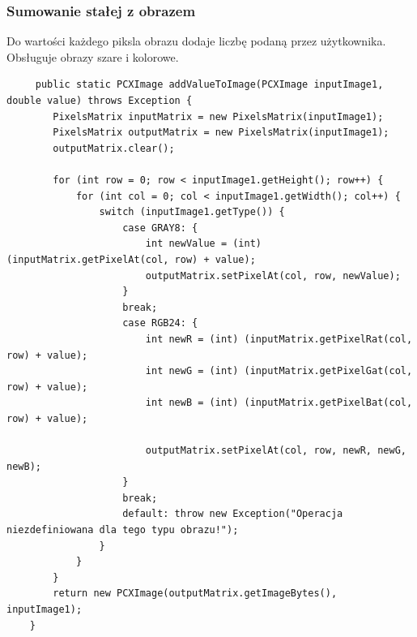 \documentclass{article}
\begin{document}
	\subsubsection{Sumowanie stałej z obrazem}
	Do wartości każdego piksla obrazu dodaje liczbę podaną przez użytkownika. Obsługuje obrazy szare i kolorowe. 
	
	\begin{verbatim}
	 public static PCXImage addValueToImage(PCXImage inputImage1, double value) throws Exception {
        PixelsMatrix inputMatrix = new PixelsMatrix(inputImage1);
        PixelsMatrix outputMatrix = new PixelsMatrix(inputImage1);
        outputMatrix.clear();

        for (int row = 0; row < inputImage1.getHeight(); row++) {
            for (int col = 0; col < inputImage1.getWidth(); col++) {
                switch (inputImage1.getType()) {
                    case GRAY8: {
                        int newValue = (int) (inputMatrix.getPixelAt(col, row) + value);
                        outputMatrix.setPixelAt(col, row, newValue);
                    }
                    break;
                    case RGB24: {
                        int newR = (int) (inputMatrix.getPixelRat(col, row) + value);
                        int newG = (int) (inputMatrix.getPixelGat(col, row) + value);
                        int newB = (int) (inputMatrix.getPixelBat(col, row) + value);

                        outputMatrix.setPixelAt(col, row, newR, newG, newB);
                    }
                    break;
                    default: throw new Exception("Operacja niezdefiniowana dla tego typu obrazu!");
                }
            }
        }
        return new PCXImage(outputMatrix.getImageBytes(), inputImage1);
    }
	\end{verbatim}
	
\end{document}
